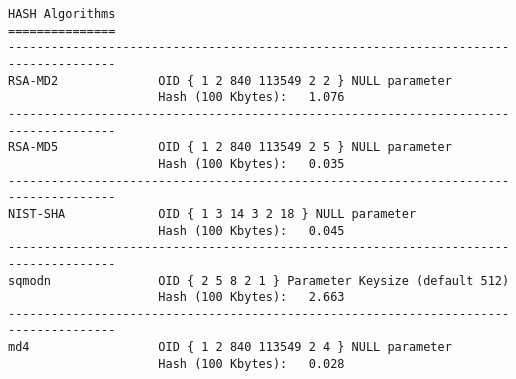 {\begin{verbatim}
HASH Algorithms
===============
-------------------------------------------------------------------------------------
RSA-MD2              OID { 1 2 840 113549 2 2 } NULL parameter
                     Hash (100 Kbytes):   1.076  
-------------------------------------------------------------------------------------
RSA-MD5              OID { 1 2 840 113549 2 5 } NULL parameter
                     Hash (100 Kbytes):   0.035  
-------------------------------------------------------------------------------------
NIST-SHA             OID { 1 3 14 3 2 18 } NULL parameter
                     Hash (100 Kbytes):   0.045  
-------------------------------------------------------------------------------------
sqmodn               OID { 2 5 8 2 1 } Parameter Keysize (default 512)
                     Hash (100 Kbytes):   2.663  
-------------------------------------------------------------------------------------
md4                  OID { 1 2 840 113549 2 4 } NULL parameter
                     Hash (100 Kbytes):   0.028  


\end{verbatim}}
